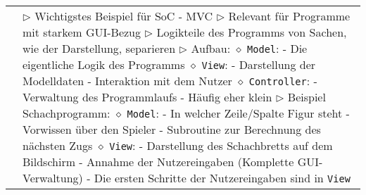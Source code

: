 \begin{longtable}{ | p{} p{} | }
	\makecell[l]{Model-View-Controller } & \makecell[l]{
	$\triangleright$ Wichtigstes Beispiel für SoC - MVC \\
	$\triangleright$ Relevant für Programme mit starkem GUI-Bezug \\
	$\triangleright$ Logikteile des Programms von Sachen, wie der Darstellung, separieren \\
	$\triangleright$ Aufbau: \\
	\hspace{0.4cm} $\diamond$ \texttt{Model}: \\
	\hspace{0.6cm} - Die eigentliche Logik des Programms \\
	\hspace{0.4cm} $\diamond$ \texttt{View}: \\
	\hspace{0.6cm} - Darstellung der Modelldaten \\
	\hspace{0.6cm} - Interaktion mit dem Nutzer \\
	\hspace{0.4cm} $\diamond$ \texttt{Controller}: \\
	\hspace{0.6cm} - Verwaltung des Programmlaufs \\ 
	\hspace{0.6cm} - Häufig eher klein \\
	$\triangleright$ Beispiel Schachprogramm: \\
	\hspace{0.4cm} $\diamond$ \texttt{Model}: \\
	\hspace{0.6cm} - In welcher Zeile/Spalte Figur steht \\
	\hspace{0.6cm} - Vorwissen über den Spieler \\
	\hspace{0.6cm} - Subroutine zur Berechnung des nächsten Zugs \\
	\hspace{0.4cm} $\diamond$ \texttt{View}: \\
	\hspace{0.6cm} - Darstellung des Schachbretts auf dem Bildschirm \\
	\hspace{0.6cm} - Annahme der Nutzereingaben (Komplette GUI-Verwaltung) \\
	\hspace{0.6cm} - Die ersten Schritte der Nutzereingaben sind in \texttt{View} \\
}
\end{longtable}
